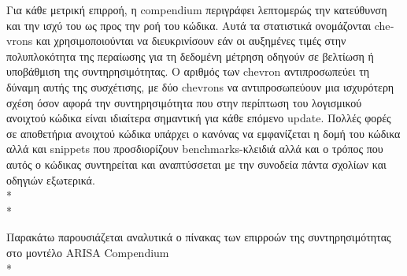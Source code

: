 \documentclass[a4paper, 11pt]{article}
\begin{document}
{{ Για κάθε
μετρική επιρροή, η \textlatin{compendium} περιγράφει λεπτομερώς την κατεύθυνση και την ισχύ του ως προς την ροή του κώδικα. Αυτά τα στατιστικά ονομάζονται \textlatin{chevrons} και χρησιμοποιούνται
να διευκρινίσουν εάν οι αυξημένες τιμές στην πολυπλοκότητα της περαίωσης για τη δεδομένη μέτρηση οδηγούν σε βελτίωση ή
υποβάθμιση της συντηρησιμότητας. Ο αριθμός των \textlatin{chevron} αντιπροσωπεύει τη δύναμη
αυτής της συσχέτισης, με δύο \textlatin{chevrons} να αντιπροσωπεύουν μια ισχυρότερη σχέση όσον αφορά την συντηρησιμότητα που στην περίπτωση του λογισμικού ανοιχτού κώδικα είναι ιδιαίτερα σημαντική για κάθε επόμενο \textlatin{update}. Πολλές φορές σε αποθετήρια ανοιχτού κώδικα υπάρχει ο κανόνας να εμφανίζεται η δομή του κώδικα αλλά και \textlatin{snippets} που προσδιορίζουν \textlatin{benchmarks}-κλειδιά αλλά και ο τρόπος που αυτός ο κώδικας συντηρείται και αναπτύσσεται με την συνοδεία πάντα σχολίων και οδηγιών εξωτερικά. \\*
\\*



Παρακάτω παρουσιάζεται αναλυτικά ο πίνακας των επιρροών της συντηρησιμότητας στο μοντέλο \textlatin{ARISA Compendium}\\*

}}
\end{document}
